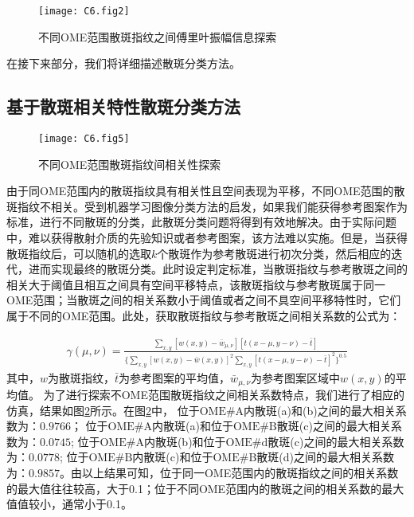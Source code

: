 \begin{figure}[htp]
	\centering
	\texttt{[image: C6.fig2]}
	\caption{不同OME范围散斑指纹之间傅里叶振幅信息探索}
	\label{fig:6.2}
\end{figure}
在接下来部分，我们将详细描述散斑分类方法。

\subsection{基于散斑相关特性散斑分类方法}

\begin{figure}[htp]
	\centering
	\texttt{[image: C6.fig5]}
	\caption{不同OME范围散斑指纹间相关性探索}
	\label{fig:6.5}
\end{figure}

由于同OME范围内的散斑指纹具有相关性且空间表现为平移，不同OME范围的散斑指纹不相关。受到机器学习图像分类方法的启发，如果我们能获得参考图案作为标准，进行不同散斑的分类，此散斑分类问题将得到有效地解决。由于实际问题中，难以获得散射介质的先验知识或者参考图案，该方法难以实施。但是，当获得散斑指纹后，可以随机的选取$k$个散斑作为参考散斑进行初次分类，然后相应的迭代，进而实现最终的散斑分类。此时设定判定标准，当散斑指纹与参考散斑之间的相关大于阈值且相互之间具有空间平移特点，该散斑指纹与参考散斑属于同一OME范围；当散斑之间的相关系数小于阈值或者之间不具空间平移特性时，它们属于不同的OME范围。此处，获取散斑指纹与参考散斑之间相关系数的公式为：

\begin{equation}
\begin{aligned}
\gamma (\mu,\nu) = \frac{\sum_{x,y} [w(x,y)- \bar{w}_{\mu,\nu}] [t(x-\mu,y-\nu)- \bar{t}]}{\{ \sum_{x,y} [w(x,y)- \bar{w}(x,y)]^2 \sum_{x,y} [t(x-\mu,y-\nu)- \bar{t}]^2  \}^{0.5}}
\label{eq:6.5}
\end{aligned}
\end{equation}
其中，$w$为散斑指纹，$\bar{t}$为参考图案的平均值，$\bar{w}_{\mu,\nu}$为参考图案区域中$w(x,y)$的平均值。
为了进行探索不OME范围散斑指纹之间相关系数特点，我们进行了相应的仿真，结果如图\ref{fig:6.5}所示。在图\ref{fig:6.5}中，
位于$\mbox{OME} \# \mbox{A}$内散斑(a)和(b)之间的最大相关系数为：$0.9766$；
位于$\mbox{OME} \# \mbox{A}$内散斑(a)和位于$\mbox{OME} \# \mbox{B}$散斑(c)之间的最大相关系数为：$0.0745$;
位于$\mbox{OME} \# \mbox{A}$内散斑(b)和位于$\mbox{OME} \# \mbox{d}$散斑(c)之间的最大相关系数为：$0.0778$;
位于$\mbox{OME} \# \mbox{B}$内散斑(c)和位于$\mbox{OME} \# \mbox{B}$散斑(d)之间的最大相关系数为：$0.9857$。由以上结果可知，位于同一OME范围内的散斑指纹之间的相关系数的最大值往往较高，大于0.1；位于不同OME范围内的散斑之间的相关系数的最大值值较小，通常小于0.1。

